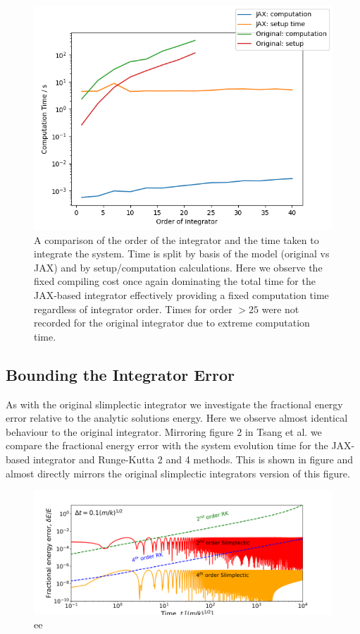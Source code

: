 \documentclass[10pt]{iopart}
\begin{document}
\begin{figure}
	\label{rplot}
	\includegraphics[width=\columnwidth]{RPlot.jpg}
	\caption{A comparison of the order of the integrator and the time taken to integrate the system. Time is split by basis of the model (original vs JAX) and by setup/computation calculations. Here we observe the fixed compiling cost once again dominating the total time for the JAX-based integrator effectively providing a fixed computation time regardless of integrator order. Times for order $>25$ were not recorded for the original integrator due to extreme computation time.}
\end{figure}

\subsection{Bounding the Integrator Error}
As with the original slimplectic integrator we investigate the fractional energy error relative to the analytic solutions energy. Here we observe almost identical behaviour to the original integrator. Mirroring figure 2 in Tsang et al. \cite{Tsang_Slimplectic} we compare the fractional energy error with the system evolution time for the JAX-based integrator and Runge-Kutta 2 and 4 methods. This is shown in figure \cite{EnergyPlot} and almost directly mirrors the original slimplectic integrators version of this figure. 

\begin{figure}
	\label{EnergyPlot}
	\includegraphics[width=\columnwidth]{EnergyPlot.png}
	\caption{ee}
\end{figure}
\end{document}
